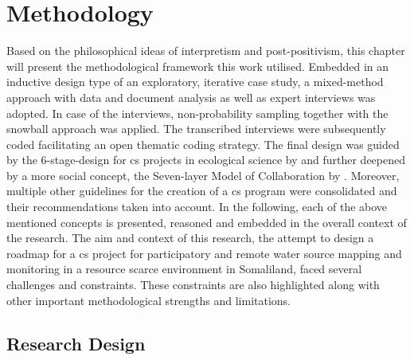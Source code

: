 
\chapter{Methodology} %

\label{chap3:methodology} %

Based on the philosophical ideas of interpretism and post-positivism, this chapter will present the methodological framework this work utilised. Embedded in an inductive design type of an exploratory, iterative case study, a mixed-method approach with data and document analysis as well as expert interviews was adopted. In case of the interviews, non-probability sampling together with the snowball approach was applied. The transcribed interviews were subsequently coded facilitating an open thematic coding strategy. The final design was guided by the 6-stage-design for \acrlong*{cs} projects in ecological science by \autocite{fraislCitizenScienceEnvironmental2022} and further deepened by a more social concept, the Seven-layer Model of Collaboration by \autocite{briggsSevenLayerModelCollaboration}. Moreover, multiple other guidelines for the creation of a \acrshort*{cs} program were consolidated and their recommendations taken into account.\newline
In the following, each of the above mentioned concepts is presented, reasoned and embedded in the overall context of the research. The aim and context of this research, the attempt to design a roadmap for a \acrshort*{cs} project for participatory and remote water source mapping and monitoring in a resource scarce environment in Somaliland, faced several challenges and constraints. These constraints are also highlighted along with other important methodological strengths and limitations.

\section{Research Design} %

